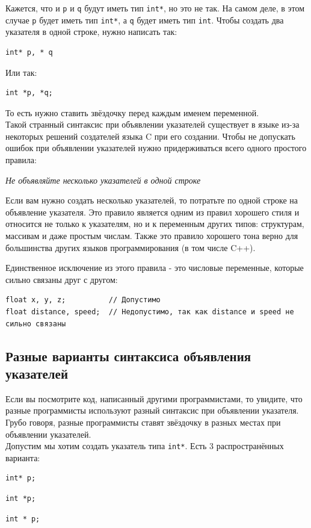 \documentclass{article}
\begin{document}
Кажется, что и \texttt{p} и \texttt{q} будут иметь тип \texttt{int*}, но это не так.
На самом деле, в этом случае \texttt{p} будет иметь тип \texttt{int*}, а \texttt{q} будет иметь тип \texttt{int}.
Чтобы создать два указателя в одной строке, нужно написать так:
\begin{lstlisting}
int* p, * q
\end{lstlisting}
Или так:
\begin{lstlisting}
int *p, *q;
\end{lstlisting}
То есть нужно ставить звёздочку перед каждым именем переменной.\\

Такой странный синтаксис при объявлении указателей существует в языке из-за некоторых
решений создателей языка C при его создании. Чтобы не допускать ошибок при объявлении указателей нужно придерживаться всего одного простого правила:

\begin{center}
\textit{Не объявляйте несколько указателей в одной строке}
\end{center}

Если вам нужно создать несколько указателей, то потратьте по одной строке на объявление указателя.
Это правило является одним из правил хорошего стиля и относится не только к указателям, но и к переменным других типов: структурам, массивам и даже простым числам. Также это правило хорошего тона верно для большинства других языков программирования (в том числе C++).

Единственное исключение из этого правила - это числовые переменные, которые сильно связаны друг с другом:
\begin{lstlisting}
float x, y, z;          // Допустимо
float distance, speed;  // Недопустимо, так как distance и speed не сильно связаны
\end{lstlisting}


\subsection*{Разные варианты синтаксиса объявления указателей}
Если вы посмотрите код, написанный другими программистами, то увидите, что разные программисты используют разный синтаксис при объявлении указателя. Грубо говоря, разные программисты ставят звёздочку в разных местах при объявлении указателей.\\
Допустим мы хотим создать указатель типа \texttt{int*}. Есть 3 распространённых варианта:
\begin{multicols}{3}
\noindent
\begin{lstlisting}
int* p;
\end{lstlisting}

\begin{lstlisting}
int *p;
\end{lstlisting}

\begin{lstlisting}
int * p;
\end{lstlisting}

\end{multicols}
\end{document}
